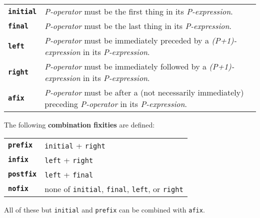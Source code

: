 \documentclass[12pt]{article}
\newcommand{\key}[1]{{\rm \bfseries #1}}
\newcommand{\ttkey}[1]{{\tt \bfseries #1}}
\begin{document}
\begin{center}
\begin{tabular}{lp{5.0in}}
\ttkey{initial}	& {\em P-operator} must be the first thing
                  in its {\em P-expression}. \\
\ttkey{final}	& {\em P-operator} must be the last thing
                  in its {\em P-expression}. \\
\ttkey{left}	& {\em P-operator} must be immediately
                  preceded by a {\em (P+1)-expression}
                  in its {\em P-expression}. \\
\ttkey{right}	& {\em P-operator} must be immediately
                  followed by a {\em (P+1)-expression}
                  in its {\em P-expression}. \\
\ttkey{afix}	& {\em P-operator} must be after a (not necessarily
                  immediately) preceding {\em P-operator}
                  in its {\em P-expression}. \\
\end{tabular}
\end{center}

The following \key{combination fixities} are defined:

\begin{center}
\begin{tabular}{ll}
\ttkey{prefix}	& {\tt initial} + {\tt right} \\
\ttkey{infix}	& {\tt left} + {\tt right} \\
\ttkey{postfix}	& {\tt left} + {\tt final} \\
\ttkey{nofix}	& none of {\tt initial}, {\tt final}, {\tt left},
                  or {\tt right} \\
\end{tabular}
\end{center}

All of these but {\tt initial} and {\tt prefix} can be combined with {\tt afix}.

\newpage
\end{document}
